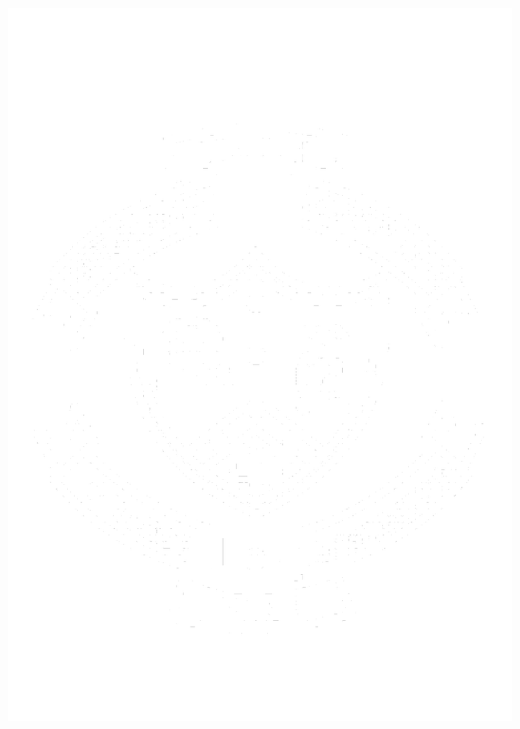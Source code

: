 \begin{titlepage}

\begin{center}

\vspace*{2\bigskipamount}

{\makeatletter
\titlestyle\bfseries\LARGE\@title
\makeatother}

{\makeatletter
\ifx\@subtitle\undefined\else
    \bigskip
    \titlefont\titleshape\Large\@subtitle
\fi
\makeatother}

\end{center}

\cleardoublepage
\thispagestyle{empty}

\begin{center}


\vspace*{2\bigskipamount}

{\makeatletter
\titlestyle\bfseries\LARGE\@title
\makeatother}

{\makeatletter
\ifx\@subtitle\undefined\else
    \bigskip
    \titlefont\titleshape\Large\@subtitle
\fi
\makeatother}

\vfill
\begin{center}
    \includegraphics[width=0.4\linewidth]{../Common/images/coep_logo.pdf}
\end{center}
\vfill


\end{center}
\end{titlepage}
